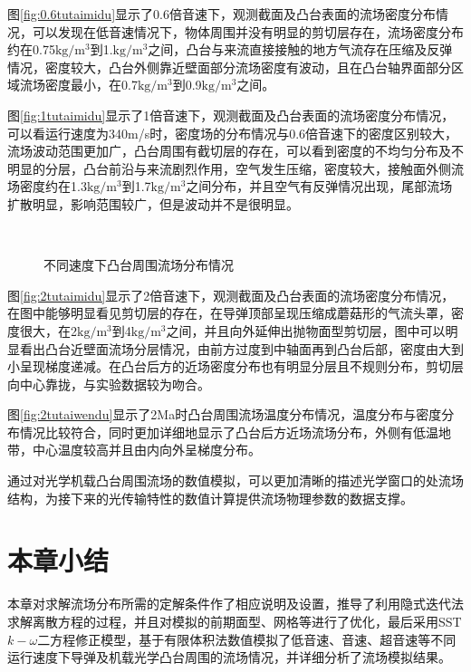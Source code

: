 图\ref{fig:0.6tutaimidu}显示了0.6倍音速下，观测截面及凸台表面的流场密度分布情况，可以发现在低音速情况下，物体周围并没有明显的剪切层存在，流场密度分布约在0.75$\text{kg}/\text{m}^3$到1.$\text{kg}/\text{m}^3$之间，凸台与来流直接接触的地方气流存在压缩及反弹情况，密度较大，凸台外侧靠近壁面部分流场密度有波动，且在凸台轴界面部分区域流场密度最小，在0.7$\text{kg}/\text{m}^3$到0.9$\text{kg}/\text{m}^3$之间。

图\ref{fig:1tutaimidu}显示了1倍音速下，观测截面及凸台表面的流场密度分布情况，可以看运行速度为340m/s时，密度场的分布情况与0.6倍音速下的密度区别较大，流场波动范围更加广，凸台周围有截切层的存在，可以看到密度的不均匀分布及不明显的分层，凸台前沿与来流剧烈作用，空气发生压缩，密度较大，接触面外侧流场密度约在1.3$\text{kg}/\text{m}^3$到1.7$\text{kg}/\text{m}^3$之间分布，并且空气有反弹情况出现，尾部流场扩散明显，影响范围较广，但是波动并不是很明显。

\begin{figure}[bhtp]
\centering
{}
\\
\caption{不同速度下凸台周围流场分布情况}
\label{fig:tutailiuchang}
\end{figure}

图\ref{fig:2tutaimidu}显示了2倍音速下，观测截面及凸台表面的流场密度分布情况，在图中能够明显看见剪切层的存在，在导弹顶部呈现压缩成蘑菇形的气流头罩，密度很大，在2$\text{kg}/\text{m}^3$到4$\text{kg}/\text{m}^3$之间，并且向外延伸出抛物面型剪切层，图中可以明显看出凸台近壁面流场分层情况，由前方过度到中轴面再到凸台后部，密度由大到小呈现梯度递减。在凸台后方的近场密度分布也有明显分层且不规则分布，剪切层向中心靠拢，与实验数据较为吻合。

图\ref{fig:2tutaiwendu}显示了2Ma时凸台周围流场温度分布情况，温度分布与密度分布情况比较符合，同时更加详细地显示了凸台后方近场流场分布，外侧有低温地带，中心温度较高并且由内向外呈梯度分布。

通过对光学机载凸台周围流场的数值模拟，可以更加清晰的描述光学窗口的处流场结构，为接下来的光传输特性的数值计算提供流场物理参数的数据支撑。
\section{本章小结}
本章对求解流场分布所需的定解条件作了相应说明及设置，推导了利用隐式迭代法求解离散方程的过程，并且对模拟的前期面型、网格等进行了优化，最后采用SST$k-\omega$二方程修正模型，基于有限体积法数值模拟了低音速、音速、超音速等不同运行速度下导弹及机载光学凸台周围的流场情况，并详细分析了流场模拟结果。

